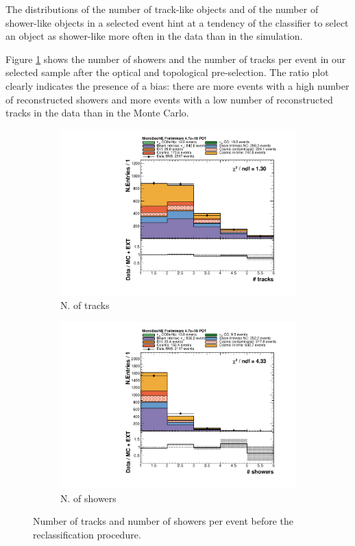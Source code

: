 The distributions of the number of track-like objects and of the number of shower-like objects in a selected event hint at a tendency of the classifier to select an object as shower-like more often in the data than in the simulation.

Figure \ref{fig:nshowers} shows the number of showers and the number of tracks per event in our selected sample after the optical and topological pre-selection. The ratio plot clearly indicates the presence of a bias: there are more events with a high number of reconstructed showers and more events with a low number of reconstructed tracks in the data than in the Monte Carlo. 

\begin{figure}[htbp]
\centering
  \begin{subfigure}{0.45\textwidth}
    \includegraphics[width=\linewidth]{figures/h_n_tracks.pdf}
    \caption{N. of tracks} 
  \end{subfigure}
    \begin{subfigure}{0.45\textwidth}
    \includegraphics[width=\linewidth]{figures/h_n_showers.pdf}
    \caption{N. of showers} 
  \end{subfigure}
  \caption{Number of tracks and number of showers per event before the reclassification procedure.}\label{fig:nshowers}
\end{figure}

